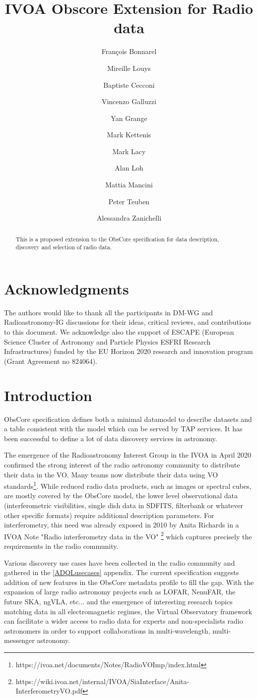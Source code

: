 \documentclass[11pt,a4paper]{ivoa}
\title{IVOA Obscore Extension for Radio data}
\author{Fran\c cois Bonnarel}
\author{Mireille Louys}
\author{Baptiste Cecconi}
\author{Vincenzo Galluzzi}
\author{Yan Grange}
\author{Mark Kettenis}
\author{Mark Lacy}
\author{Alan Loh}
\author{Mattia Mancini}
\author{Peter Teuben}
\author{Alessandra Zanichelli}
\begin{document}
\begin{abstract}
This is a proposed extension to the ObsCore specification for data description, discovery and selection of radio data.
\end{abstract}

\section*{Acknowledgments}

The authors would like to thank all the participants in DM-WG and Radioastronomy-IG discussions
for their ideas, critical reviews, and contributions to this document.
We acknowledge also the support of  ESCAPE (European Science Cluster of Astronomy
and Particle Physics ESFRI Research Infrastructures) funded by the EU Horizon
2020 research and innovation program (Grant Agreement no 824064).

\section{Introduction}


ObsCore specification \citep{2017ivoa.spec.0509L} defines both a minimal datamodel to describe datasets
and a table consistent with the model which can be served by TAP services. It has been successful
to define a lot of data discovery services in astronomy.

The emergence  of  the Radioastronomy Interest Group in the IVOA in April 2020 confirmed the strong
interest of the radio astronomy community to distribute their data in the VO. Many teams now
distribute their data using VO standards\footnote{https://ivoa.net/documents/Notes/RadioVOImp/index.html}.
While reduced radio data products, such as images or spectral cubes,%
are mostly covered by the ObsCore model, the lower level observational data
(interferometric visibilities, single dish data in SDFITS, filterbank or whatever other specific formats) require additional description parameters.
For interferometry, this need  was already exposed
in 2010 by Anita Richards in a IVOA Note  "Radio interferometry data in the VO" 
\footnote{https://wiki.ivoa.net/internal/IVOA/SiaInterface/Anita-InterferometryVO.pdf} which captures precisely the requirements in the radio community.
 
 Various discovery use cases have been collected in the radio community and gathered in the \ref{ADQLusecases} appendix.
  The current specification suggests addition of new features in the ObsCore metadata profile to fill the gap.
With the expansion of large radio astronomy projects such as LOFAR, NenuFAR, the future SKA, ngVLA, etc...
and the emergence of interesting research topics matching data in all electromagnetic regimes, the
Virtual Observatory framework can facilitate a wider access to radio data for experts and
non-specialists radio astronomers in order to support collaborations in multi-wavelength,
multi-messenger astronomy.
\end{document}
